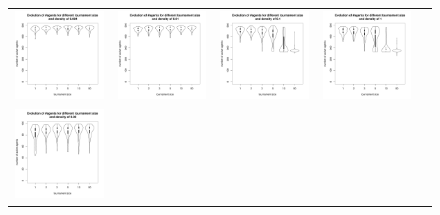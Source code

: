 \documentclass[a4paper]{article}
\begin{document}

\begin{figure}
    \begin{tabular}[H]{lcccc}
	\includegraphics[width=.25\textwidth]{img/500/agentwrtK_D-0004.pdf} &
	\includegraphics[width=.25\textwidth]{img/500/agentwrtK_D-0010.pdf} &
	\includegraphics[width=.25\textwidth]{img/500/agentwrtK_D-0100.pdf} &
	\includegraphics[width=.25\textwidth]{img/500/agentwrtK_D-1000.pdf} \\
	\includegraphics[width=.25\textwidth]{img/100/agentwrtK_D-0020.pdf} &

\end{tabular}
\end{figure}
\end{document}
